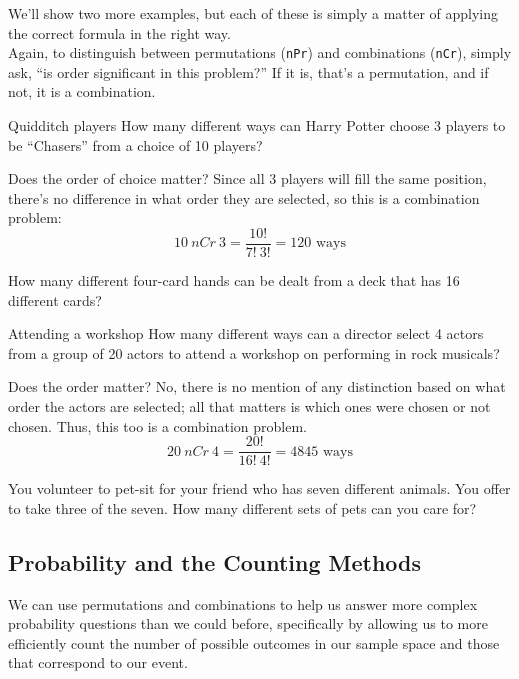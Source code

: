 We'll show two more examples, but each of these is simply a matter of applying the correct formula in the right way.\\

Again, to distinguish between permutations (\texttt{nPr}) and combinations (\texttt{nCr}), simply ask, ``is order significant in this problem?''  If it is, that's a permutation, and if not, it is a combination.
\vfill
\pagebreak

\begin{example}[https://www.youtube.com/watch?v=KQVo1KwtF1c]{Quidditch players}
How many different ways can Harry Potter choose 3 players to be ``Chasers''
from a choice of 10 players?

\sol
Does the order of choice matter?  Since all 3 players will fill the same position, there's no difference in what order they are selected, so this is a combination problem:
\[10\ nCr\ 3 = \dfrac{10!}{7! \ 3!} = \boxed{120 \textrm{ ways}}\]
\end{example}

\begin{try}
How many different four-card hands can be dealt from a deck that has 16
different cards?
\end{try}

\begin{example}[https://www.youtube.com/watch?v=LnFSPX3VKXM]{Attending a workshop}
How many different ways can a director select 4 actors from a group of 20
actors to attend a workshop on performing in rock musicals?

\sol
Does the order matter?  No, there is no mention of any distinction based on what order the actors are selected; all that matters is which ones were chosen or not chosen.  Thus, this too is a combination problem.
\[20\ nCr\ 4 = \dfrac{20!}{16! \ 4!} = \boxed{4845 \textrm{ ways}}\]
\end{example}

\begin{try}
You volunteer to pet-sit for your friend who has seven different animals. You
offer to take three of the seven. How many different sets of pets can you care for?
\end{try}

\subsection{Probability and the Counting Methods}
We can use permutations and combinations to help us answer more complex probability questions than we could before, specifically by allowing us to more efficiently count the number of possible outcomes in our sample space and those that correspond to our event.

